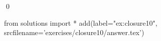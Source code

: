 
\begin{ex} 
  \label{ex:closure10}
  
  \qed
\end{ex} 
\begin{python0}
from solutions import *
add(label="ex:closure10",
    srcfilename='exercises/closure10/answer.tex') 
\end{python0}
